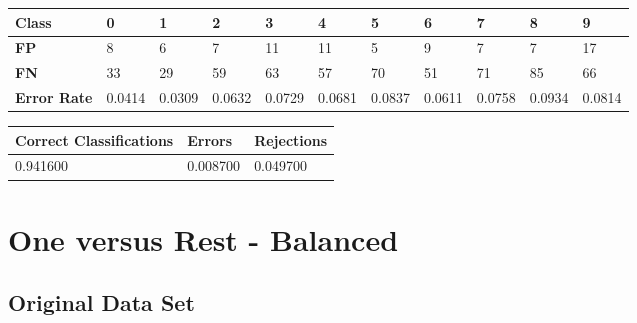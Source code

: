 \documentclass[
  a4paper,            %
  DIV=10,             %
  oneside,            %
  BCOR=5mm,           %
  parskip=half,       %
  numbers=noenddot,   %
  bibtotoc,           %
  listof=totoc,        %
  article
]{scrreprt}
\begin{document}
\begin{center}
  \begin{tabular}{|p{1cm}|p{1cm}|p{1cm}|p{1cm}|p{1cm}|p{1cm}|p{1cm}|p{1cm}|p{1cm}|p{1cm}|p{1cm}|}
    \hline
    \textbf{Class} & \textbf{0} & \textbf{1} & \textbf{2} & \textbf{3} & \textbf{4} & \textbf{5} & \textbf{6} & \textbf{7} & \textbf{8} & \textbf{9} \\
    \hline
    \textbf{FP} & 8 & 6 & 7 & 11 & 11 & 5 & 9 & 7 & 7 & 17 \\
    \hline
    \textbf{FN} & 33 & 29 & 59 & 63 & 57 & 70 & 51 & 71 & 85 & 66 \\
    \hline
    \textbf{Error Rate} & 0.0414 & 0.0309 & 0.0632 & 0.0729 & 0.0681 & 0.0837 & 0.0611 & 0.0758 & 0.0934 & 0.0814 \\
    \hline
  \end{tabular}
\end{center}

\begin{center}
  \begin{tabular}{|p{5cm}|p{3cm}|p{3cm}|}
    \hline
    \textbf{Correct Classifications} & \textbf{Errors} & \textbf{Rejections} \\
    \hline
    0.941600 & 0.008700 & 0.049700 \\
    \hline
  \end{tabular}
\end{center}
\section{One versus Rest - Balanced}
\subsection{Original Data Set}
\end{document}
